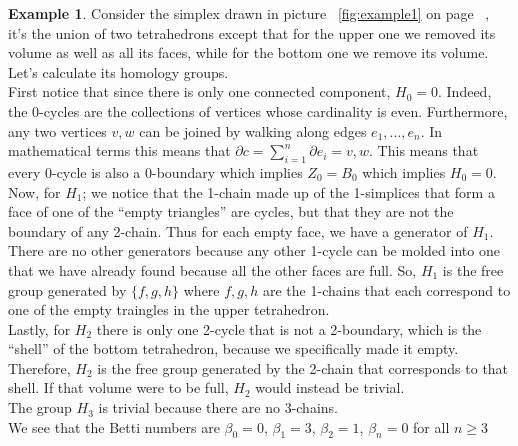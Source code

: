 \documentclass{article}
\theoremstyle{plain}
\theoremstyle{definition}
\newtheorem{example}{Example}[section]
\theoremstyle{remark}
\begin{document}
\begin{example}
Consider the simplex drawn in picture ~\ref{fig:example1} on page ~\pageref{fig:example1}, it's the union of two tetrahedrons except that for the upper one we removed its volume as well as all its faces, while for the bottom one we remove its volume.
Let’s calculate its homology groups. \\ First notice that since there is only one connected component, $H_0 = 0$. Indeed, the $0$-cycles are the collections of vertices whose cardinality is even. Furthermore, any two vertices $v,w$ can be joined by walking along edges $e_1, \dots, e_n$. In mathematical terms this means that $\partial c = \sum_{i=1}^n \partial e_i = {v,w}$. This means that every 0-cycle is also a 0-boundary which implies $Z_0 = B_0$ which implies $H_0 = 0$.\\
Now, for $H_1$; we notice that the 1-chain made up of the 1-simplices that form a face of one of the “empty triangles” are cycles, but that they are not the boundary of any 2-chain. Thus for each empty face, we have a generator of $H_1$. There are no other generators because any other 1-cycle can be molded into one that we have already found because all the other faces are full. So, $H_1$ is the free group generated by $\{f,g,h\}$ where $f,g,h$ are the 1-chains that each correspond to one of the empty traingles in the upper tetrahedron. \\
Lastly, for $H_2$ there is only one 2-cycle that is not a 2-boundary, which is the “shell” of the bottom tetrahedron, because we specifically made it empty. Therefore, $H_2$ is the free group generated by the 2-chain that corresponds to that shell. If that volume were to be full, $H_2$ would instead be trivial.\\
The group $H_3$ is trivial because there are no 3-chains. \\
We see that the Betti numbers are $\beta_0 = 0$, $\beta_1 = 3$, $\beta_2 = 1$, $\beta_n = 0$ for all $n \geq 3$

\begin{figure}[ht!]
\begin{center}
\end{center}
\end{figure}
\end{example}
\end{document}
